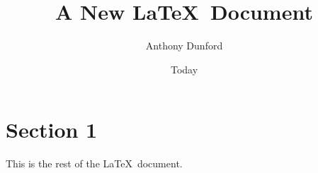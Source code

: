\documentclass[a4paper]{article}
\title{A New \LaTeX\ Document}
\author{Anthony Dunford}
\date{Today}
\begin{document}
\maketitle
\section{Section 1}
This is the rest of the \LaTeX\ document.
\end{document}
